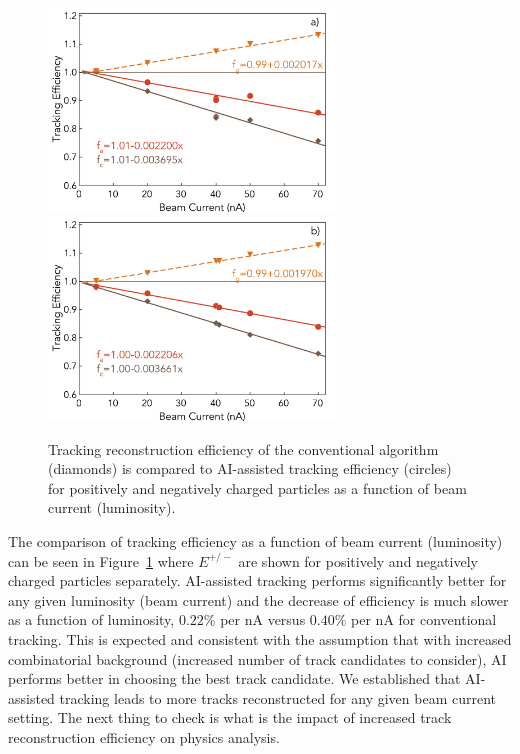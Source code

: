 \documentclass[aps,prl,preprint,12pt]{revtex4}
\begin{document}
 \begin{figure}[!ht]
\begin{center}
 \includegraphics[width=3.0in]{images/figure_lscan_pos.pdf}
 \includegraphics[width=3.0in]{images/figure_lscan_neg.pdf}
\caption {Tracking reconstruction efficiency of the conventional algorithm (diamonds)
is compared to AI-assisted tracking efficiency (circles) for positively and negatively 
charged particles as a function of beam current (luminosity).   }
 \label{lumi:scan}
 \end{center}
\end{figure}

The comparison of tracking efficiency as a function of beam current (luminosity) can be 
seen in Figure~\ref{lumi:scan} where $E^{+/-}$ are shown for positively and negatively charged 
particles separately. AI-assisted tracking performs significantly better for any given luminosity 
(beam current) and the decrease of efficiency is much slower as a function of luminosity, $0.22\%$ 
per nA versus $0.40\%$ per nA for conventional tracking. This is expected and consistent with the 
assumption that with increased combinatorial background (increased number of track candidates 
to consider), AI performs better in choosing the best track candidate. We established that AI-assisted
tracking leads to more tracks reconstructed for any given beam current setting. The next thing to 
check is what is the impact of increased track reconstruction efficiency on physics analysis.
\end{document}
